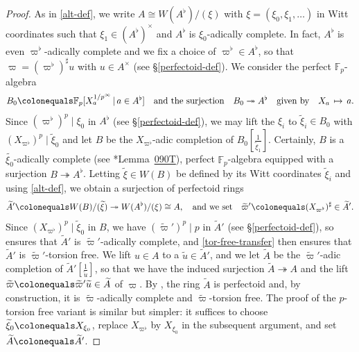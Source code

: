 \documentclass[11pt, reqno]{amsart}
\newcommand{\bF}{\mathbb{F}}
\newcommand{\ce}{\colonequals}
\newcommand{\surjects}{\twoheadrightarrow}
\newcommand{\wt}{\widetilde}
\providecommand{\f}[2]{\frac{#1}{#2}}
\providecommand{\qxq}[1]{\quad\text{#1}\quad}
\newcommand{\tst}{\textstyle}
\newcommand{\bpf}{\begin{proof}}
\newcommand{\epf}{\end{proof}}
\numberwithin{equation}{numberingbase}
\theoremstyle{thms}
\theoremstyle{claims}
\theoremstyle{defs}
\theoremstyle{thms}
\theoremstyle{defs}
\theoremstyle{subsection-tweak}
\theoremstyle{subsection-tweak}
\begin{document}
\bpf
As in \eqref{alt-def}, we write $A \cong W(A^\flat)/(\xi)$ with $\xi = (\xi_0, \xi_1, \dotsc)$ in Witt coordinates such that $\xi_1 \in (A^\flat)^\times$ and $A^\flat$ is $\xi_0$-adically complete. In fact, $A^\flat$ is even $\varpi^\flat$-adically complete and we fix a choice of $\varpi^\flat \in A^\flat$, so that $\varpi = (\varpi^\flat)^\sharp u $ with $u \in A^\times$ (see \S\ref{perfectoid-def}). 
We consider the perfect $\bF_p$-algebra 
\[
\tst B_0 \ce \bF_p[X_a^{1/p^\infty}\, \vert\, a \in A^\flat] \qxq{and the surjection} B_0 \surjects A^\flat \qxq{given by} %
X_a\, \mapsto\, a.
\]
Since $(\varpi^\flat)^p \mid \xi_0$ in $A^\flat$ (see \S\ref{perfectoid-def}), we may lift the $\xi_i$ to $\wt{\xi}_i \in B_0$ with $(X_{\varpi^\flat})^p \mid \wt{\xi}_0$ 
and let $B$ be the $X_{\varpi^\flat}$-adic completion of $B_0[\f{1}{\wt{\xi}_1}]$. Certainly, $B$ is a $\wt{\xi_0}$-adically complete (see \cite{SP}*{Lemma~\href{https://stacks.math.columbia.edu/tag/090T}{090T}}), perfect $\bF_p$-algebra equipped with a surjection $B \surjects A^\flat$. Letting $\wt{\xi} \in W(B)$ be defined by its Witt coordinates $\wt{\xi}_i$ and using \eqref{alt-def}, we obtain a surjection of perfectoid rings %
\[
\wt{A}' \ce W(B)/(\wt{\xi}) \surjects W(A^\flat)/(\xi) \cong A, \qxq{and we set} \wt{\varpi}' \ce (X_{\varpi^\flat})^\sharp \in \wt{A}'. 
\]
Since $(X_{\varpi^\flat})^p \mid \wt{\xi}_0$ in $B$, we have $(\wt{\varpi}')^p \mid p$ in $\wt{A}'$ (see \S\ref{perfectoid-def}), so  ensures that $\wt{A}'$ is $\wt{\varpi}'$-adically complete, and \eqref{tor-free-transfer}  then  ensures that $\wt{A}'$ is $\wt{\varpi}'$-torsion free. We lift $u \in A$ to a $\wt{u} \in \wt{A}'$, and we let $\wt{A}$ be the $\wt{\varpi}'$-adic completion  of $\wt{A}'[\f 1{\wt{u}}]$, so that we have the induced surjection $\wt{A} \surjects A$ and the lift $\wt{\varpi} \ce \wt{\varpi}' \wt{u} \in \wt{A}$ of $\varpi$. By , the ring $\wt{A}$ is perfectoid and, by construction, it is $\wt{\varpi}$-adically complete and $\wt{\varpi}$-torsion free. The proof of the $p$-torsion free variant %
is similar but simpler: it suffices to choose $\wt{\xi}_0 \ce X_{\xi_0}$, replace $X_{\varpi^\flat}$ by $X_{\xi_0}$ in the subsequent argument, and set $\wt{A} \ce \wt{A}'$.
\epf
\end{document}

